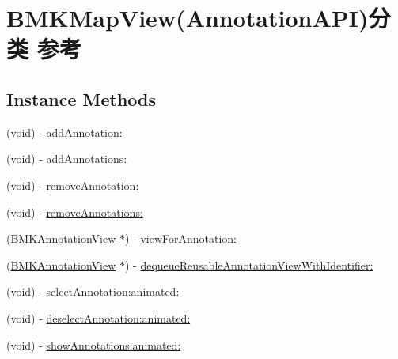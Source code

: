 \hypertarget{category_b_m_k_map_view_07_annotation_a_p_i_08}{\section{B\+M\+K\+Map\+View(Annotation\+A\+P\+I)分类 参考}
\label{category_b_m_k_map_view_07_annotation_a_p_i_08}
}
\subsection*{Instance Methods}
\begin{DoxyCompactItemize}
\item 
(void) -\/ \hyperlink{category_b_m_k_map_view_07_annotation_a_p_i_08_a2af9ed45c3a7fd530dd414dc573327b3}{add\+Annotation\+:}
\item 
(void) -\/ \hyperlink{category_b_m_k_map_view_07_annotation_a_p_i_08_affd032313c55ae27814430b760e4aea0}{add\+Annotations\+:}
\item 
(void) -\/ \hyperlink{category_b_m_k_map_view_07_annotation_a_p_i_08_a6b6b75a5bf8b02854767f782a38d2009}{remove\+Annotation\+:}
\item 
(void) -\/ \hyperlink{category_b_m_k_map_view_07_annotation_a_p_i_08_a37fbe2b5db750affb4e0234cbf24a3c7}{remove\+Annotations\+:}
\item 
(\hyperlink{interface_b_m_k_annotation_view}{B\+M\+K\+Annotation\+View} $\ast$) -\/ \hyperlink{category_b_m_k_map_view_07_annotation_a_p_i_08_a0fb885234188aef28df944d5f636c70c}{view\+For\+Annotation\+:}
\item 
(\hyperlink{interface_b_m_k_annotation_view}{B\+M\+K\+Annotation\+View} $\ast$) -\/ \hyperlink{category_b_m_k_map_view_07_annotation_a_p_i_08_a4d4aa7a171876f3f66add8f86cca1e8c}{dequeue\+Reusable\+Annotation\+View\+With\+Identifier\+:}
\item 
(void) -\/ \hyperlink{category_b_m_k_map_view_07_annotation_a_p_i_08_a92dbf00c3eff2ede4d4ffd485c4059e0}{select\+Annotation\+:animated\+:}
\item 
(void) -\/ \hyperlink{category_b_m_k_map_view_07_annotation_a_p_i_08_a3d6bbc91bc3b66463ee97b3c909e4999}{deselect\+Annotation\+:animated\+:}
\item 
(void) -\/ \hyperlink{category_b_m_k_map_view_07_annotation_a_p_i_08_a62093e51bd52b357d909b75b4447b415}{show\+Annotations\+:animated\+:}
\end{DoxyCompactItemize}
